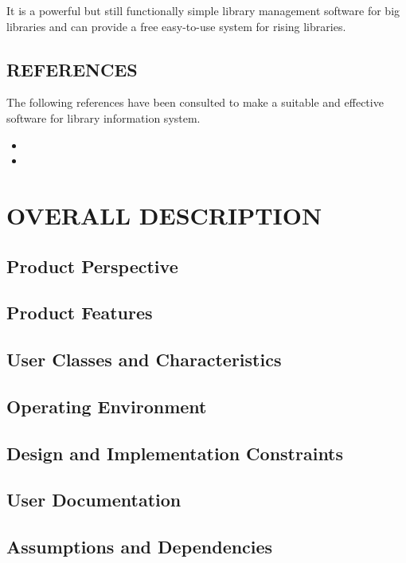 \documentclass{article}
\begin{document}
It is a powerful but still functionally simple library management software for big libraries and can provide a free easy-to-use system for rising libraries.

\subsection{REFERENCES}
The following references have been consulted to make a suitable and effective software for library information system.

\begin{itemize}
\item 
\item 
\end{itemize}


\section{OVERALL DESCRIPTION}
\subsection{Product Perspective}

\subsection{Product Features}

\subsection{User Classes and Characteristics}

\subsection{Operating Environment}

\subsection{Design and Implementation Constraints}

\subsection{User Documentation}

\subsection{Assumptions and Dependencies}
\end{document}
